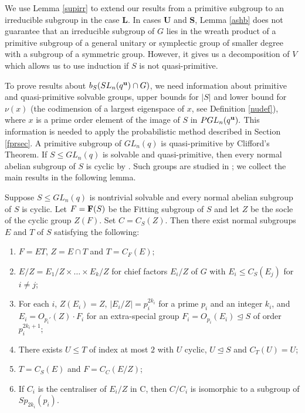 We use Lemma \ref{supirr} to extend our results from a primitive subgroup  to an irreducible subgroup in the case {\bf L}. In cases {\bf U} and {\bf S}, Lemma \ref{ashb} does not guarantee that an irreducible subgroup of ${G}$ lies in the wreath product of a primitive subgroup of a general unitary  or symplectic group of smaller degree with a subgroup of a symmetric group. However, it gives us a decomposition of $V$ which allows us to use induction if $S$ is not quasi-primitive.

To prove results about $b_S(SL_n(q^{\bf u}) \cap {G})$, we need  information about  primitive and quasi-primitive solvable groups, upper bounds for $|S|$ and lower bound for $\nu(x)$ (the codimension of a largest eigenspace of $x$, see Definition \ref{nudef}), where $x$ is a prime order element of the image of $S$ in $PGL_n(q^{\bf u}).$  This information is needed to apply the probabilistic method described in Section \ref{fprsec}.
A primitive subgroup of $GL_n(q)$ is quasi-primitive by Clifford's Theorem.  If $S \le GL_n(q)$ is solvable and { quasi-primitive}, then every  normal abelian subgroup of $S$ is cyclic by 
\cite[Lemma 0.5]{manz}. Such groups are  studied in \cite{manz}; we collect the main results in the following lemma.

\begin{Lem} \label{olaf}
Suppose $S \le GL_n(q)$ is nontrivial solvable and every normal abelian subgroup of $S$ is cyclic. Let $F = {\bf F}(S)$ be the Fitting subgroup of $S$ and let $Z$ be the socle of the cyclic
group $Z(F)$. Set $C=C_S(Z)$. Then there exist normal subgroups $E$ and $T$ of $S$ satisfying the following: 
\begin{enumerate}[font=\normalfont]
\item $F=ET$, $Z=E \cap T$ and $T=C_F(E);$
\item $E/Z = E_1/Z \times \ldots \times E_k/Z$ for chief factors $E_i/Z$ of $G$ with 
$E_i \le C_S(E_j)$ for  $i \ne j$;
\item For each $i$, $Z(E_i) = Z$, $|E_i/Z| = p_i^{2k_i}$ for a prime $p_i$ and an integer
$k_i$, and $E_i= O_{p_i'} (Z) \cdot F_i$ for an extra-special group $F_i = O_{p_i} (E_i) \trianglelefteq S$ of order $p_i^{2k_i+1};$
\item There exists $U \le  T$ of index at most $2$ with $U$ cyclic, $U \trianglelefteq S$ and
$C_T(U)=U$;
\item $T = C_S(E)$ and $F = C_C(E/Z)$;
\item If $C_i$ is the centraliser of $E_i/Z$ in C, then $C/C_i$ is isomorphic to a subgroup of $ Sp_{2k_i}(p_i)$.
\end{enumerate}
\end{Lem}

